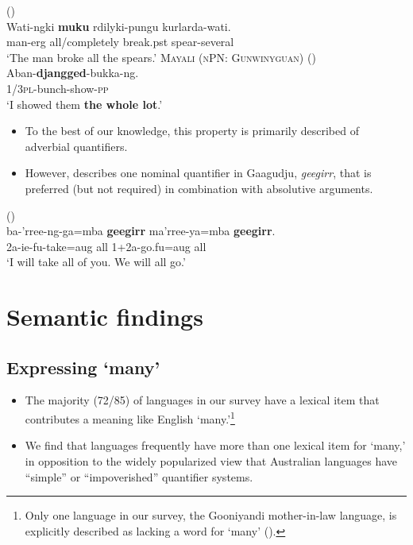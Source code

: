 \documentclass{article}
\makeatletter
\newcommand{\ofy}{/85} %
\makeatother
\begin{document}
\begin{exe}
   (\citealt[15]{bowler17})\\
  \gll Wati-ngki \textbf{muku} rdilyki-pungu kurlarda-wati.\\
  man-{\sc erg} all/completely break.{\sc pst} spear-several\\
  \glt `The man broke all the spears.'
  \ex \textsc{Mayali (nPN: Gunwinyguan)} (\citealt[233]{evans95})\\
  \gll Aban-\textbf{djangged}-bukka-ng.\\
  1/3\textsc{pl}-bunch-show-\textsc{pp}\\
  \glt `I showed them \textbf{the whole lot}.'
\end{exe}

\begin{itemize}
\item To the best of our knowledge, this property is primarily described of adverbial quantifiers. \item However, \cite{harvey92} describes one nominal quantifier in Gaagudju, {\it geegirr}, that is preferred (but not required) in combination with absolutive arguments.
\end{itemize}

\begin{exe}
   (\citealt[307]{harvey92})\\
  \gll ba-'rree-ng-ga=mba \textbf{geegirr} ma'rree-ya=mba \textbf{geegirr}.\\ 
  2{\sc a-ie-fu}-take={\sc aug} all 1+2{\sc a}-go.{\sc fu=aug} all\\
  \glt `I will take all of you. We will all go.'
\end{exe}


\section{Semantic findings}
\label{sec:semfind}

\subsection{Expressing `many'}

\begin{itemize}
\item The majority (72\ofy) of languages in our survey have a lexical item that  contributes a meaning like English `many.'\footnote{Only one language in our survey, the Gooniyandi mother-in-law language, is explicitly described as lacking a word for `many' (\citealt[636]{mcgregor89}).}
\item We find that languages frequently have more than one lexical item for `many,' in opposition to the widely popularized view that Australian languages have ``simple'' or ``impoverished'' quantifier systems.
\end{itemize}
\end{document}
